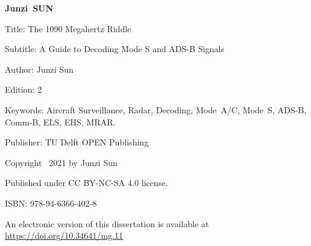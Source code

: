 \begin{titlepage}

\thispagestyle{empty}

\vspace*{2\bigskipamount}

{\makeatletter
\titlestyle\bfseries\Huge\@title
\makeatother}

{\makeatletter
\ifx\@subtitle\undefined\else
    \bigskip
    \titlefont\titleshape\LARGE\@subtitle
\fi
\makeatother}


\vspace*{8\bigskipamount}


\makeatletter
{\huge\titlefont\bfseries{Junzi}\ {SUN}}
\makeatother

\vspace*{8\bigskipamount}

\makeatletter
{\large{}}
\makeatother


\clearpage


\thispagestyle{empty}

\vspace*{19\bigskipamount}


Title: The 1090 Megahertz Riddle

\medskip

Subtitle: A Guide to Decoding Mode S and ADS-B Signals

\medskip

Author: Junzi Sun

\medskip

Edition: 2

\medskip

Keywords: Aircraft Surveillance, Radar, Decoding, Mode~A/C, Mode~S, ADS-B, Comm-B, ELS, EHS, MRAR.

\medskip

Publisher: TU Delft OPEN Publishing

\vspace{4\bigskipamount}


Copyright \textcopyright\ 2021 by Junzi Sun

\medskip

Published under CC BY-NC-SA 4.0 license.

\medskip
ISBN: 978-94-6366-402-8

\medskip
\medskip
An electronic version of this dissertation is available at \\
\url{https://doi.org/10.34641/mg.11}

\end{titlepage}